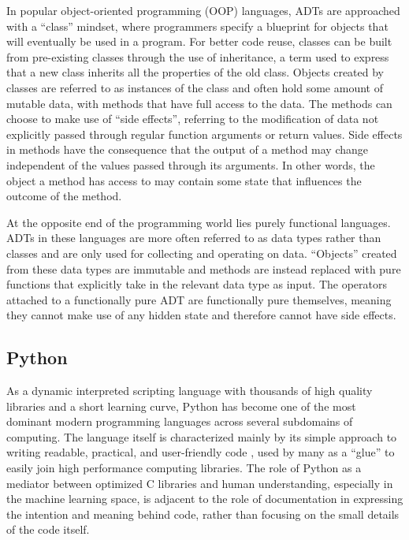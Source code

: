 \documentclass{article}
\begin{document}
In popular object-oriented programming (OOP) languages,
ADTs are approached with a ``class'' mindset, where programmers specify a blueprint for objects that
will eventually be used in a program. For better code reuse, classes can be built from pre-existing classes
through the use of inheritance, a term used to express that a new class inherits all the properties of the old class.
Objects created by classes are referred to as instances of the class and often hold
some amount of mutable data, with methods that have full access to the data. The methods can choose to make use of
``side effects'', referring to the modification of data not explicitly passed through
regular function arguments or return values. Side effects in methods have the consequence that the output of
a method may change independent of the values passed through its arguments. In other words,
the object a method has access to may contain some state that influences the outcome of the method.

At the opposite end of the programming world lies purely functional languages. ADTs in these languages
are more often referred to as data types rather than classes and are only used for collecting and operating on data.
``Objects'' created from these data types are immutable and methods are instead replaced with pure functions that
explicitly take in the relevant data type as input. The operators attached to a functionally pure ADT are functionally
pure themselves, meaning they cannot make use of any hidden state and therefore cannot have side effects.

\subsection{Python}

As a dynamic interpreted scripting language with thousands of high quality libraries and a short learning curve,
Python has become one of the most dominant modern programming languages across several subdomains of computing.
The language itself is characterized mainly by its simple approach to writing readable, practical, and user-friendly code \cite{pythonZen},
used by many as a ``glue'' to easily join high performance computing libraries. The role of Python as a mediator
between optimized C libraries and human understanding, especially in the machine learning space, is adjacent to the role
of documentation in expressing the intention and meaning behind code,
rather than focusing on the small details of the code itself.
\end{document}

